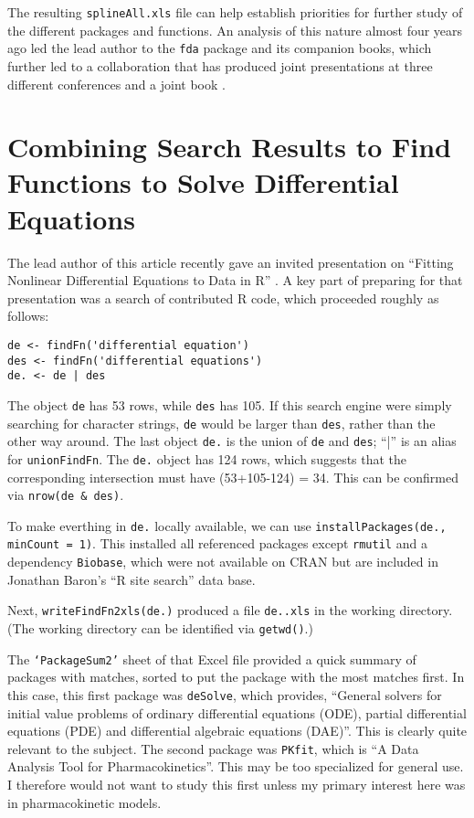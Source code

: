The resulting {\tt splineAll.xls} file can help establish priorities
for further study of the different packages and functions.  An
analysis of this nature almost four years ago led the lead author
to the {\tt fda} package and its companion books, which further
led to a collaboration that has produced joint presentations at
three different conferences and a joint book \citep{RHG09}.


\section*{Combining Search Results to Find Functions to Solve Differential Equations}

The lead author of this article recently gave an invited presentation
on ``Fitting Nonlinear Differential Equations to Data in R'' \citep{GHR09}.
A key part of preparing for that presentation was a search of
contributed R code, which proceeded roughly as follows:

\begin{verbatim}
de <- findFn('differential equation')
des <- findFn('differential equations')
de. <- de | des
\end{verbatim}

The object {\tt de} has 53 rows, while {\tt des} has 105.
If this search engine were simply searching for character
strings, {\tt de} would be larger than {\tt des}, rather than
the other way around.  The last object {\tt de.} is the union
of {\tt de} and {\tt des};  ``|'' is an alias for {\tt unionFindFn}.
The {\tt de.} object has 124 rows, which suggests that
the corresponding intersection must have (53+105-124) = 34.
This can be confirmed via {\tt nrow(de \& des)}.

To make everthing in {\tt de.} locally available, we can use
{\tt installPackages(de., minCount = 1)}.  This installed all
referenced packages except {\tt rmutil} and a dependency {\tt Biobase},
which were not available on CRAN but are included in Jonathan
Baron's ``R site search'' data base.

Next, {\tt writeFindFn2xls(de.)} produced a file {\tt de..xls}
in the working directory.  (The working directory can be
identified via {\tt getwd()}.)

The {\tt `PackageSum2'} sheet of that Excel file provided a quick
summary of packages with matches, sorted to put the package
with the most matches first.  In this case, this first package
was {\tt deSolve}, which provides, ``General solvers for initial
value problems of ordinary differential equations (ODE),
partial differential equations (PDE) and differential
algebraic equations (DAE)''.  This is clearly quite relevant
to the subject.  The second package was {\tt PKfit}, which
is ``A Data Analysis Tool for Pharmacokinetics''.  This may
be too specialized for general use.  I therefore would not
want to study this first unless my primary interest here was in
pharmacokinetic models.


